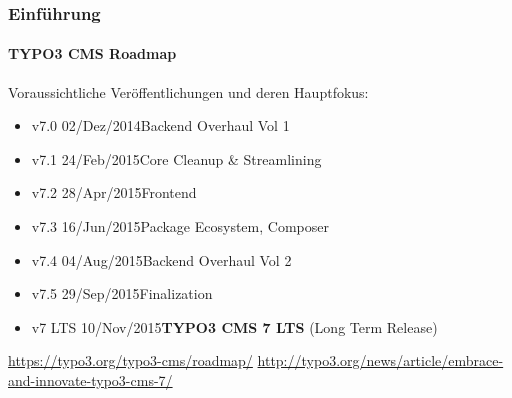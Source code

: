 \begin{frame}[fragile]
	\frametitle{Einführung}
	\framesubtitle{TYPO3 CMS Roadmap}

	Voraussichtliche Veröffentlichungen und deren Hauptfokus:

	\begin{itemize}
		\item v7.0 \tabto{1.1cm}02/Dez/2014\tabto{3.4cm}Backend Overhaul Vol 1
		\item v7.1 \tabto{1.1cm}24/Feb/2015\tabto{3.4cm}Core Cleanup \& Streamlining
		\item v7.2 \tabto{1.1cm}28/Apr/2015\tabto{3.4cm}Frontend
		\item v7.3 \tabto{1.1cm}16/Jun/2015\tabto{3.4cm}Package Ecosystem, Composer
		\item v7.4 \tabto{1.1cm}04/Aug/2015\tabto{3.4cm}Backend Overhaul Vol 2
		\item v7.5 \tabto{1.1cm}29/Sep/2015\tabto{3.4cm}Finalization

		\item
			\begingroup
				\color{typo3orange}
					v7 LTS \tabto{1.1cm}10/Nov/2015\tabto{3.4cm}\textbf{TYPO3 CMS 7 LTS} (Long Term Release)
			\endgroup

	\end{itemize}

	\smaller
		\url{https://typo3.org/typo3-cms/roadmap/}\newline
		\url{http://typo3.org/news/article/embrace-and-innovate-typo3-cms-7/}
	\normalsize

\end{frame}

